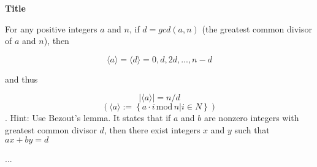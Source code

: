 \question \textbf{Title}

For any positive integers $a$ and $n$, if $d = gcd(a, n)$ (the greatest common divisor of $a$ and $n$),
then

$$ \langle a \rangle  = \langle d \rangle  = {0, d, 2d, . . . , n − d}$$

and thus

$$|\langle a \rangle | = n/d$$
$$(\langle a \rangle  := \left\{a \cdot i\,\text{mod}\,n | i \in N\right\})$$.
Hint: Use Bezout’s lemma. It states that if $a$ and $b$ are nonzero integers with greatest common divisor $d$, then there exist integers $x$ and $y$ such that $ax + by = d$


\begin{solution}
...
\end{solution}
